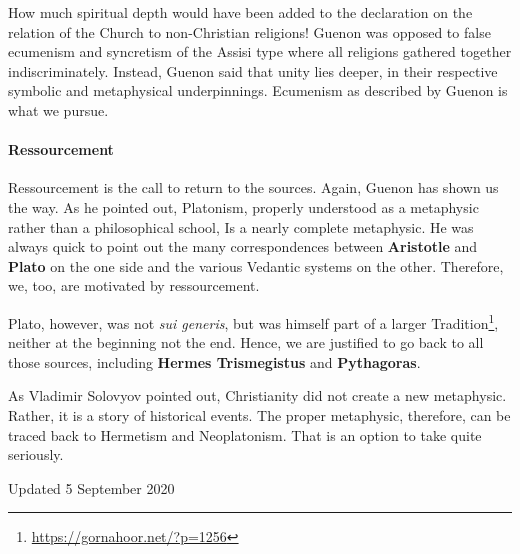How much spiritual depth would have been added to the declaration on the relation of the Church to non-Christian religions! Guenon was opposed to false ecumenism and syncretism of the Assisi type where all religions gathered together indiscriminately. Instead, Guenon said that unity lies deeper, in their respective symbolic and metaphysical underpinnings. Ecumenism as described by Guenon is what we pursue.

\paragraph{Ressourcement}


Ressourcement is the call to return to the sources. Again, Guenon has shown us the way. As he pointed out, Platonism, properly understood as a metaphysic rather than a philosophical school, Is a nearly complete metaphysic. He was always quick to point out the many correspondences between \textbf{Aristotle} and \textbf{Plato} on the one side and the various Vedantic systems on the other. Therefore, we, too, are motivated by ressourcement.

Plato, however, was not \emph{sui generis}, but was himself part of a larger Tradition\footnote{\url{https://gornahoor.net/?p=1256}}, neither at the beginning not the end. Hence, we are justified to go back to all those sources, including \textbf{Hermes Trismegistus} and \textbf{Pythagoras}.


As Vladimir Solovyov pointed out, Christianity did not create a new metaphysic. Rather, it is a story of historical events. The proper metaphysic, therefore, can be traced back to Hermetism and Neoplatonism. That is an option to take quite seriously.

Updated 5 September 2020



